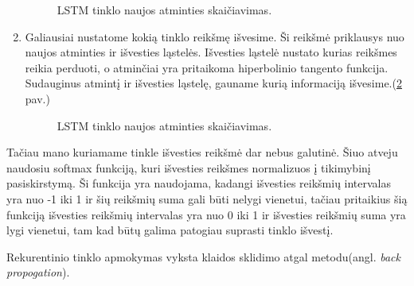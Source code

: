 \begin{enumerate}
\clearpage
\begin{figure}[h!]
  \centering
{}
\caption{LSTM tinklo naujos atminties skaičiavimas.}
\label{fig:lstmnewc}
\end{figure}
\item Galiausiai nustatome kokią tinklo reikšmę išvesime. Ši reikšmė priklausys nuo naujos atminties ir išvesties ląstelės. Išvesties ląstelė nustato kurias reikšmes reikia perduoti, o atminčiai yra pritaikoma hiperbolinio tangento funkcija. Sudauginus atmintį ir išvesties ląstelę, gauname kurią informaciją išvesime.(\ref{fig:lstmoutput} pav.)
\begin{figure}[h!]
  \centering
{}
\caption{LSTM tinklo naujos atminties skaičiavimas.}
\label{fig:lstmoutput}
\end{figure}
\end{enumerate}

Tačiau mano kuriamame tinkle išvesties reikšmė dar nebus galutinė. Šiuo atveju naudosiu softmax funkciją, kuri išvesties reikšmes normalizuos į tikimybinį pasiskirstymą. Ši funkcija yra naudojama, kadangi išvesties reikšmių intervalas yra nuo -1 iki 1 ir šių reikšmių suma gali būti nelygi vienetui, tačiau pritaikius šią funkciją išvesties reikšmių intervalas yra nuo 0 iki 1 ir išvesties reikšmių suma yra lygi vienetui, tam kad būtų galima patogiau suprasti tinklo išvestį.

Rekurentinio tinklo apmokymas vyksta klaidos sklidimo atgal metodu(angl. \textit{back propogation}).

